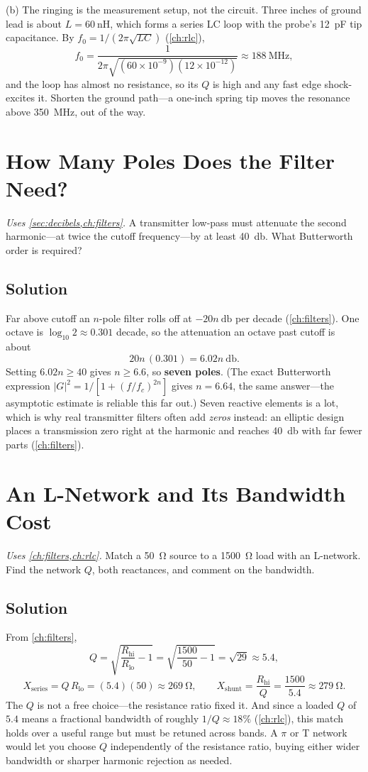 (b) The ringing is the measurement setup, not the circuit. Three inches of ground lead
is about \(L=\SI{60}{\nano\henry}\), which forms a series LC loop with the probe's
\SI{12}{\pico\farad} tip capacitance. By \(f_0=1/(2\pi\sqrt{LC})\)
(\cref{ch:rlc}),
\[
f_0=\frac{1}{2\pi\sqrt{(60\times10^{-9})(12\times10^{-12})}}\approx\SI{188}{\mega\hertz},
\]
and the loop has almost no resistance, so its \(Q\) is high and any fast edge
shock-excites it. Shorten the ground path---a one-inch spring tip moves the resonance
above \SI{350}{\mega\hertz}, out of the way.

\section{How Many Poles Does the Filter Need?}
\emph{Uses \cref{sec:decibels,ch:filters}.} A transmitter low-pass must attenuate the
second harmonic---at twice the cutoff frequency---by at least \SI{40}{\decibel}. What
Butterworth order is required?

\subsection*{Solution}
Far above cutoff an \(n\)-pole filter rolls off at \(-20n\ \si{\decibel}\) per decade
(\cref{ch:filters}). One octave is \(\log_{10}2\approx0.301\) decade, so the
attenuation an octave past cutoff is about
\[
20n\,(0.301)=6.02n\ \si{\decibel}.
\]
Setting \(6.02n\ge40\) gives \(n\ge6.6\), so \textbf{seven poles}. (The exact
Butterworth expression \(|G|^2=1/[1+(f/f_c)^{2n}]\) gives \(n=6.64\), the same
answer---the asymptotic estimate is reliable this far out.) Seven reactive elements is
a lot, which is why real transmitter filters often add \emph{zeros} instead: an
elliptic design places a transmission zero right at the harmonic and reaches
\SI{40}{\decibel} with far fewer parts (\cref{ch:filters}).

\section{An L-Network and Its Bandwidth Cost}
\emph{Uses \cref{ch:filters,ch:rlc}.} Match a \SI{50}{\ohm}
source to a \SI{1500}{\ohm} load with an L-network. Find the network \(Q\), both
reactances, and comment on the bandwidth.

\subsection*{Solution}
From \cref{ch:filters},
\[
Q=\sqrt{\frac{R_{\text{hi}}}{R_{\text{lo}}}-1}=\sqrt{\frac{1500}{50}-1}=\sqrt{29}\approx5.4,
\]
\[
X_{\text{series}}=Q\,R_{\text{lo}}=(5.4)(50)\approx\SI{269}{\ohm},
\qquad
X_{\text{shunt}}=\frac{R_{\text{hi}}}{Q}=\frac{1500}{5.4}\approx\SI{279}{\ohm}.
\]
The \(Q\) is not a free choice---the resistance ratio fixed it. And since a loaded
\(Q\) of \(5.4\) means a fractional bandwidth of roughly \(1/Q\approx18\%\)
(\cref{ch:rlc}), this match holds over a useful range but must be retuned across
bands. A \(\pi\) or T network would let you choose \(Q\) independently of the
resistance ratio, buying either wider bandwidth or sharper harmonic rejection as
needed.
